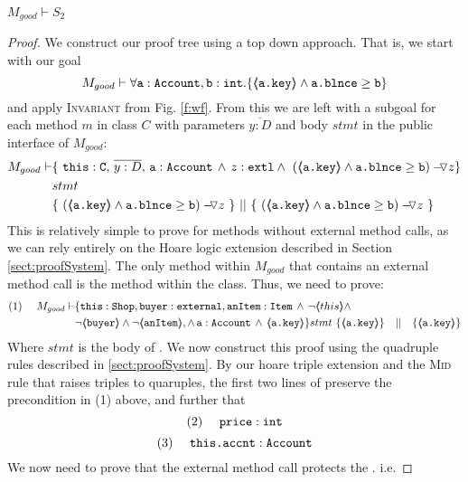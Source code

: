 \begin{lemma}
$M_{good} \vdash S_2$
\end{lemma}
\begin{proof}
We construct our proof tree using a top down approach.  That is, we start with our goal
$$M_{good} \vdash \forall {\mbox{\normalfont{\texttt{a}}}:\mbox{\normalfont{\texttt{Account}}}, \mbox{\normalfont{\texttt{b}}} : \mbox{\normalfont{\texttt{int}}}}.{{\{}}{\langle\!\!\langle \mbox{\normalfont{\texttt{a.key}}} \rangle\!\!\rangle \wedge \mbox{\normalfont{\texttt{a.blnce}}} \geq \mbox{\normalfont{\texttt{b}}}}{{\}}}$$
and apply  \textsc{Invariant} from Fig. \ref{f:wf}.
From this we are left with a subgoal for each method $m$ in  class $C$ with parameters $\overline{y:D}$ and body $stmt$ in the public interface of $M_{good}$:
\small
\begin{align*}
M_{good} \vdash
		& \{ \ \prg{this}:\prg{C},\, \overline{y:D},\, \prg{a}:\prg{Account}\, \wedge\, 
\external z \wedge\ {\PushASLong {z} {(\inside{\prg{a.key}} \wedge \prg{a.blnce} \geq \prg{b})}}\} \\
		& stmt\ \\
		& \{\ {\PushASLong {z} {(\inside{\prg{a.key}} \wedge \prg{a.blnce} \geq \prg{b})}}\ \}\ ||\ \{\ {\PushASLong {z} {(\inside{\prg{a.key}} \wedge \prg{a.blnce} \geq \prg{b})}} \ 			\} 
\end{align*}
\normalsize
This is relatively simple to prove for methods without external method calls, as we can rely entirely on the Hoare logic extension described in Section \ref{sect:proofSystem}. The only  method within $M_{good}$ that contains 
an external method call is  the  method within the  class. Thus, we need to prove:
\small
\begin{align*}
\text{(1)} \ \ \ \ M_{good} \vdash & \{  \prg{this}:\prg{Shop}, \prg{buyer} : \prg{external}, \prg{anItem} : \prg{Item} \, \wedge\, \neg\inside{this}\wedge \\ 
		&\neg\inside{\prg{buyer}} \wedge \neg\inside{\prg{anItem}}, \wedge\, \prg{a} : \prg{Account}\, \wedge\,  \inside{\prg{a.key}} \} 
		 stmt\ \{ \inside{\prg{a.key}} \} \ \ \  || \ \ \ \{ \inside{\prg{a.key}} \}
\end{align*}
\normalsize
Where $stmt$ is the body of . We now construct this proof using the quadruple rules described in \ref{sect:proofSystem}. By our hoare triple extension and the \textsc{Mid} rule that raises triples to quaruples, the first two lines
of  preserve the precondition in (1) above, and further that 
\small
$$
\text{(2)} \ \ \ \ \mbox{\normalfont{\texttt{price}}} : \mbox{\normalfont{\texttt{int}}}
$$ 
$$
\text{(3)} \ \ \ \ \prg{this.accnt} : \prg{Account}
$$ 
We now need to prove that the external method call  protects the . i.e.

\end{proof}
